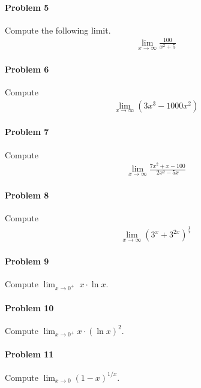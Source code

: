 \documentclass[a4paper, 11pt]{article}
\begin{document}
\paragraph{Problem 5}
Compute the following limit.
\begin{align}
    \lim_{x\rightarrow \infty} \frac{100}{x^2 + 5}  \nonumber
\end{align}


\paragraph{Problem 6}
Compute
\begin{align}
    \lim_{x\rightarrow \infty} (3x^3 - 1000x^2)  \nonumber
\end{align}


\paragraph{Problem 7}
Compute
\begin{align}
    \lim_{x\rightarrow \infty} \frac{7x^2 + x - 100}{2x^2 - 5x}  \nonumber
\end{align}


\paragraph{Problem 8}
Compute
\begin{align}
    \lim_{x\rightarrow \infty} \left( 3^x + 3^{2x} \right)^{\frac{1}{x}}  \nonumber
\end{align}


\paragraph{Problem 9}
Compute $\lim_{x\rightarrow 0^+} \; x \cdot \ln x$.


\paragraph{Problem 10}
Compute $\lim_{x \rightarrow 0^+} x \cdot \left( \ln x \right)^2$.


\paragraph{Problem 11}
Compute $\lim_{x \rightarrow 0 } (1-x)^{1/x}$.
\end{document}
